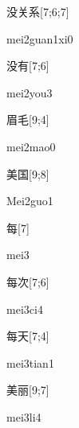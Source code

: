\begin{verbete}{没关系}[7;6;7]
\begin{pronuncia}{mei2guan1xi0}
\end{pronuncia}
\end{verbete}

\begin{verbete}{没有}[7;6]
\begin{pronuncia}{mei2you3}
\end{pronuncia}
\end{verbete}

\begin{verbete}{眉毛}[9;4]
\begin{pronuncia}{mei2mao0}
\end{pronuncia}
\end{verbete}

\begin{verbete}{美国}[9;8]
\begin{pronuncia}{Mei2guo1}
\end{pronuncia}
\end{verbete}

\begin{verbete}[mei3]{每}[7]
\begin{pronuncia}{mei3}
\end{pronuncia}
\end{verbete}

\begin{verbete}[mei3ci4]{每次}[7;6]
\begin{pronuncia}{mei3ci4}
\end{pronuncia}
\end{verbete}

\begin{verbete}{每天}[7;4]
\begin{pronuncia}{mei3tian1}
\end{pronuncia}
\end{verbete}

\begin{verbete}[mei3li4]{美丽}[9;7]
\begin{pronuncia}{mei3li4}
\end{pronuncia}
\end{verbete}

